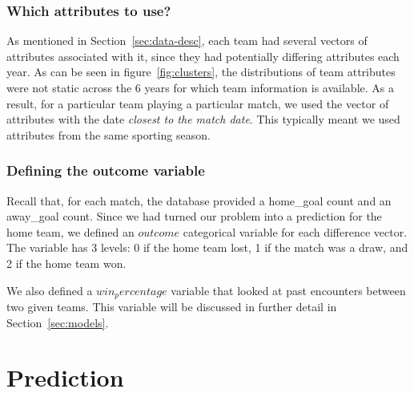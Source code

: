 \documentclass[11pt]{article}
\begin{document}
\subsubsection{Which attributes to use?}
As mentioned in Section~\ref{sec:data-desc}, each team had several vectors of attributes associated with it, since they had potentially differing attributes each year.
As can be seen in figure~\ref{fig:clusters}, the distributions of team attributes were not static across the 6 years for which team information is available.
As a result, for a particular team playing a particular match, we used the vector of attributes with the date \textit{closest to the match date}.
This typically meant we used attributes from the same sporting season.

\subsubsection{Defining the outcome variable}
Recall that, for each match, the database provided a home\_goal count and an away\_goal count.
Since we had turned our problem into a prediction for the home team, we defined an $outcome$ categorical variable for each difference vector.
The variable has 3 levels: 0 if the home team lost, 1 if the match was a draw, and 2 if the home team won.

We also defined a $win_percentage$ variable that looked at past encounters between two given teams.
This variable will be discussed in further detail in Section~\ref{sec:models}.

\section{Prediction}



\end{document}
